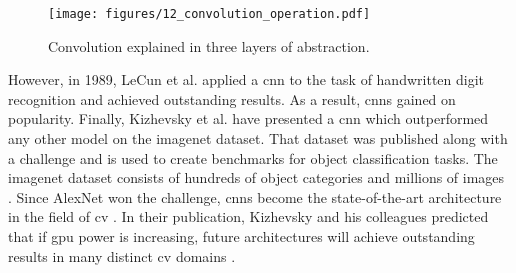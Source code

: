 \begin{figure}
	\label{fig:convs}
	\texttt{[image: figures/12\_convolution\_operation.pdf]}
	\caption{Convolution explained in three layers of abstraction.}
\end{figure}
%
\noindent However, in 1989, LeCun et al. applied a \ac{cnn} to the task of handwritten digit recognition \cite{lecun-90c} and achieved outstanding results. As a result, \acp{cnn} gained on popularity. Finally, Kizhevsky et al. have presented a \ac{cnn} which outperformed any other model on the \ac{imagenet} dataset. That dataset was published along with a challenge and is used to create benchmarks for object classification tasks. The \ac{imagenet} dataset consists of hundreds of object categories and millions of images \cite{ILSVRC15}. Since AlexNet won the challenge, \acp{cnn} become the state-of-the-art architecture in the field of \ac{cv} \cite{Schmidhuber15}. In their publication, Kizhevsky and his colleagues predicted that if \ac{gpu} power is increasing, future architectures will achieve outstanding results in many distinct \ac{cv} domains \cite{NIPS2012_c399862d}.\\


